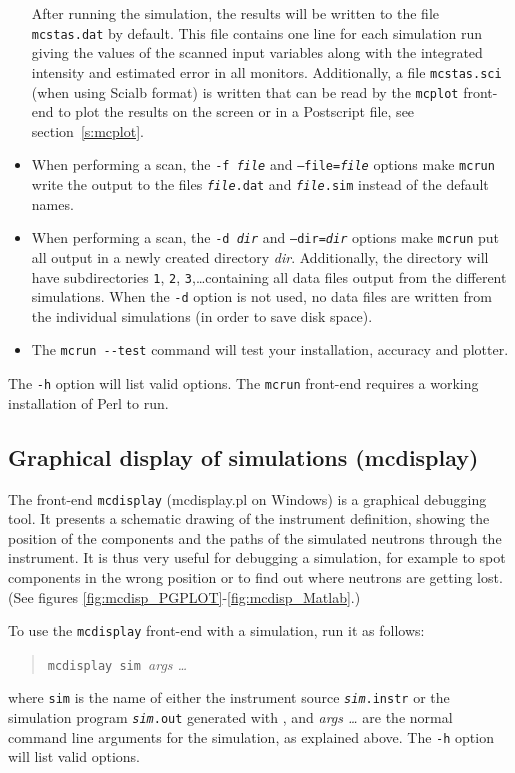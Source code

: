 \begin{itemize}
After running the simulation, the results will be written to the file
\verb+mcstas.dat+ by default. This file contains one line for each
simulation run giving the values of the scanned input variables along
with the integrated intensity and estimated error in all monitors. Additionally, a
file \verb+mcstas.sci+ (when using Scialb format) is written that can be read by the \verb+mcplot+
front-end to plot the results on the screen or in a Postscript file, see
section~\ref{s:mcplot}. 
\item When performing a scan, the \texttt{-f {\it file}} and
  \texttt{--file={\it file}} options make \verb+mcrun+ write the output
  to the files \texttt{{\it file\/}.dat} and \texttt{{\it file\/}.sim}
  instead of the default names.
\item When performing a scan, the \texttt{-d {\it dir}} and
  \texttt{--dir={\it dir}} options make \verb+mcrun+ put all output in a
  newly created directory \textit{dir}. Additionally, the directory will
  have subdirectories \verb+1+, \verb+2+, \verb+3+,\ldots containing all
  data files output from the different simulations. When the \verb+-d+
  option is not used, no data files are written from the individual
  simulations (in order to save disk space).
\item The \verb+mcrun --test+ command will test your \MCS installation, accuracy and plotter. 
\end{itemize}

The \verb+-h+ option will list valid options. The \verb+mcrun+ front-end requires a working installation of Perl to run.


\subsection{Graphical display of simulations (mcdisplay)}
\label{s:mcdisplay}

The front-end \verb+mcdisplay+ (mcdisplay.pl on Windows) is a graphical debugging tool.
It presents a schematic drawing of the instrument
definition, showing the position of the components and the paths of the
simulated neutrons through the instrument. It is thus very useful for
debugging a simulation, for example to spot components in the wrong
position or to find out where neutrons are getting lost.
(See figures \ref{fig:mcdisp_PGPLOT}-\ref{fig:mcdisp_Matlab}.)

To use the \verb+mcdisplay+ front-end with a simulation, run it as
follows:
\begin{quote}
  \verb+mcdisplay sim +{\it args \ldots}
\end{quote}
where \verb+sim+ is the name of either the instrument source \texttt{{\it sim}.instr} or the simulation program \texttt{{\it sim}.out} generated with
\MCS, and \textit{args \ldots} are the normal command line arguments for
the simulation, as explained above. The \verb+-h+ option will list valid options.

